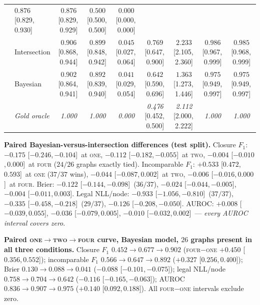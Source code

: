 \begin{landscape}
\begin{table}[p]
\begin{tabular}{@{}ll ccccccc@{}}
   & $0.876$ \tiny[0.829,\,0.930]
   & $0.876$ \tiny[0.829,\,0.929]
   & $0.500$ \tiny[0.500,\,0.500]
   & $0.000$ \tiny[0.000,\,0.000] \\
 & Intersection
   & $0.906$ \tiny[0.868,\,0.944]
   & $0.899$ \tiny[0.848,\,0.942]
   & $0.045$ \tiny[0.027,\,0.064]
   & $0.769$ \tiny[0.647,\,0.900]
   & $2.233$ \tiny[2.105,\,2.360]
   & $0.986$ \tiny[0.967,\,0.999]
   & $0.985$ \tiny[0.968,\,0.999] \\
 & Bayesian
   & $0.902$ \tiny[0.864,\,0.941]
   & $0.892$ \tiny[0.839,\,0.940]
   & $0.041$ \tiny[0.029,\,0.054]
   & $\mathbf{0.642}$ \tiny[0.590,\,0.696]
   & $1.363$ \tiny[1.273,\,1.446]
   & $0.975$ \tiny[0.949,\,0.997]
   & $0.975$ \tiny[0.949,\,0.997] \\
 & \textit{Gold oracle}
   & \textit{1.000} & \textit{1.000} & \textit{0.000}
   & \textit{0.476} \tiny[0.452,\,0.500]
   & \textit{2.112} \tiny[2.000,\,2.222]
   & \textit{1.000} & \textit{1.000} \\
\bottomrule
\end{tabular}

\vspace{3pt}
\begin{minipage}{0.98\linewidth}
\footnotesize
\textbf{Paired Bayesian-versus-intersection differences (test split).}
Closure $F_1$: $-0.175$ \tiny[$-0.246$,\,$-0.104$]\normalsize\ at \textsc{one},
$-0.112$ \tiny[$-0.182$,\,$-0.055$]\normalsize\ at \textsc{two},
$-0.004$ \tiny[$-0.010$,\,$0.000$]\normalsize\ at \textsc{four}
($24/26$ graphs exactly tied).
Incomparable $F_1$: $+0.533$ \tiny[$0.472$,\,$0.593$]\normalsize\ at
\textsc{one} ($37/37$ wins), $-0.044$
\tiny[$-0.087$,\,$0.002$]\normalsize\ at \textsc{two},
$-0.006$ \tiny[$-0.016$,\,$0.000$]\normalsize\ at \textsc{four}.
Brier: $-0.122$ \tiny[$-0.144$,\,$-0.098$]\normalsize\ ($36/37$),
$-0.024$ \tiny[$-0.044$,\,$-0.005$]\normalsize,
$-0.004$ \tiny[$-0.011$,\,$0.003$]\normalsize.
Legal NLL/node: $-0.933$ \tiny[$-1.056$,\,$-0.810$]\normalsize\ ($37/37$),
$-0.335$ \tiny[$-0.458$,\,$-0.218$]\normalsize\ ($29/37$),
$-0.126$ \tiny[$-0.208$,\,$-0.050$]\normalsize.
AUROC: $+0.008$ \tiny[$-0.039$,\,$0.055$]\normalsize,
$-0.036$ \tiny[$-0.079$,\,$0.005$]\normalsize,
$-0.010$ \tiny[$-0.032$,\,$0.002$]\normalsize\ --- \emph{every AUROC interval
covers zero}.

\textbf{Paired \textsc{one}$\rightarrow$\textsc{two}$\rightarrow$\textsc{four}
curve, Bayesian model, $26$ graphs present in all three conditions.}
Closure $F_1$ $0.452 \to 0.677 \to 0.902$
(\textsc{four}$-$\textsc{one} $+0.450$ \tiny[$0.356$,\,$0.552$]\normalsize);
incomparable $F_1$ $0.566 \to 0.647 \to 0.892$
($+0.327$ \tiny[$0.256$,\,$0.400$]\normalsize);
Brier $0.130 \to 0.088 \to 0.041$
($-0.088$ \tiny[$-0.101$,\,$-0.075$]\normalsize);
legal NLL/node $0.758 \to 0.704 \to 0.642$
($-0.116$ \tiny[$-0.165$,\,$-0.063$]\normalsize);
AUROC $0.836 \to 0.907 \to 0.975$
($+0.140$ \tiny[$0.092$,\,$0.188$]\normalsize).
All \textsc{four}$-$\textsc{one} intervals exclude zero.


\end{minipage}
\end{table}
\end{landscape}
